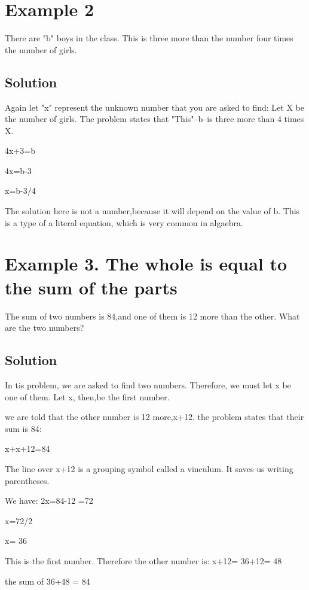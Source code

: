 \documentclass[12pt]{article}%
\begin{document}
\section{Example 2}
There are "b" boys in the class. This is three more than the number four times the number of girls.
\subsection {Solution}
Again let "x" represent the unknown number that you are asked to find: Let X be the number of girls. The problem states that "This"--b--is three more than 4 times X. 
          
          4x+3=b
          
          4x=b-3
          
          x=b-3/4
          
 The solution here is not a number,because it will depend on the value of b. This is a type of a literal equation, which is very common in algaebra.

\section{Example 3. The whole is equal to the sum of the parts}

The sum of two numbers is 84,and one of them is 12 more than the other. What are the two numbers?

\subsection{Solution}
In tis problem, we are asked to find two numbers. Therefore, we must let x be one of them. Let x, then,be the first number.

  we are told that the other number is 12 more,x+12.
  the problem states that their sum is 84: 
                         
                       x+x+12=84
                       
 The line over x+12 is a grouping symbol called a vinculum. It saves us writing parentheses.
 
 We have:
 2x=84-12
          =72
          
          x=72/2
          
          x= 36
          
          
This is the first number. Therefore the other number is:
     x+12= 36+12= 48
     
     the sum of 36+48 = 84
    
\end{document}
